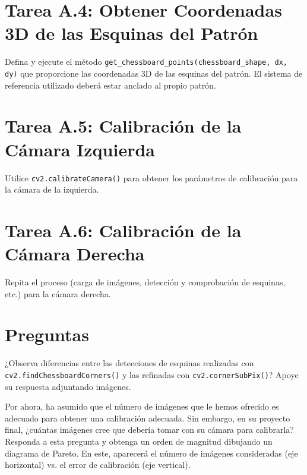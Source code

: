 \section*{Tarea A.4: Obtener Coordenadas 3D de las Esquinas del Patrón}
Defina y ejecute el método \texttt{get\_chessboard\_points(chessboard\_shape, dx, dy)} que proporcione las coordenadas 3D de las esquinas del patrón. El sistema de referencia utilizado deberá estar anclado al propio patrón.

\section*{Tarea A.5: Calibración de la Cámara Izquierda}
Utilice \texttt{cv2.calibrateCamera()} para obtener los parámetros de calibración para la cámara de la izquierda.

\section*{Tarea A.6: Calibración de la Cámara Derecha}
Repita el proceso (carga de imágenes, detección y comprobación de esquinas, etc.) para la cámara derecha.

\section*{Preguntas}

\vspace{5mm}
\begin{tcolorbox}[colback=gray!10, colframe=gray!30, coltitle=black, title=Pregunta 1, halign=left]
¿Observa diferencias entre las detecciones de esquinas realizadas con \texttt{cv2.findChessboardCorners()} y las refinadas con \texttt{cv2.cornerSubPix()}? Apoye su respuesta adjuntando imágenes.
\end{tcolorbox}

\vspace{5mm}
\begin{tcolorbox}[colback=gray!10, colframe=gray!30, coltitle=black, title=Pregunta 2, halign=left]
Por ahora, ha asumido que el número de imágenes que le hemos ofrecido es adecuado para obtener una calibración adecuada. Sin embargo, en su proyecto final, ¿cuántas imágenes cree que debería tomar con su cámara para calibrarla? Responda a esta pregunta y obtenga un orden de magnitud dibujando un diagrama de Pareto. En este, aparecerá el número de imágenes consideradas (eje horizontal) vs. el error de calibración (eje vertical).
\end{tcolorbox}